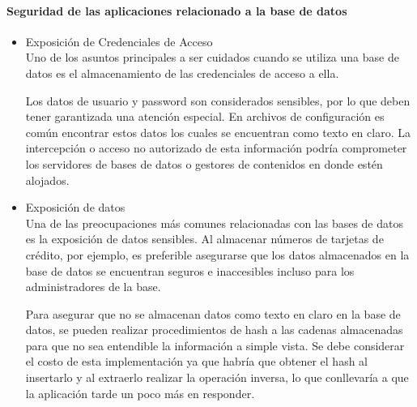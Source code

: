 \documentclass[12pt, a4paper, titlepage]{article}
\begin{document}
		\paragraph{Seguridad de las aplicaciones relacionado a la base de datos} 
		\begin{itemize}
		    \item Exposición de Credenciales de Acceso \\
		    Uno de los asuntos principales a ser cuidados cuando se utiliza una base de datos es el almacenamiento de las credenciales de acceso a ella.

            Los datos de usuario y password son considerados sensibles, por lo que deben tener garantizada una atención especial. En archivos de configuración es común encontrar estos datos los cuales se encuentran como texto en claro.
            La intercepción o acceso no autorizado de esta información podría comprometer los servidores de bases de datos o  gestores de contenidos en donde estén alojados. 
            
            \item Exposición de datos \\
            Una de las preocupaciones más comunes relacionadas con las bases de datos es la exposición de datos sensibles. Al almacenar números de tarjetas de crédito, por ejemplo, es preferible asegurarse que los datos almacenados en la base de datos se encuentran seguros e inaccesibles incluso para los administradores de la base.

            Para asegurar que no se almacenan datos como texto en claro en la base de datos, se pueden realizar procedimientos de hash a las cadenas almacenadas para que no sea entendible la información a simple vista. Se debe considerar el costo de esta implementación ya que habría que obtener el hash al insertarlo y al extraerlo realizar la operación inversa, lo que conllevaría a que la aplicación tarde un poco más en responder.
            
		\end{itemize}
		
\end{document}
